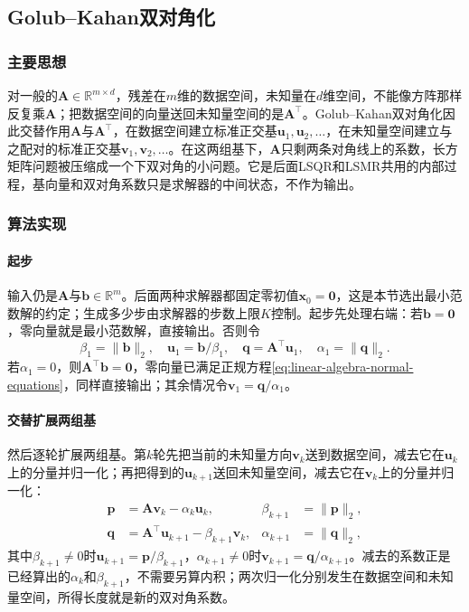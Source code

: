 \subsection{Golub--Kahan双对角化}
\label{sec:ls-bidiagonal-iteration}

\subsubsection{主要思想}

对一般的$\bm A\in\mathbb R^{m\times d}$，残差在$m$维的数据空间，未知量在$d$维空间，不能像方阵那样反复乘$\bm A$；把数据空间的向量送回未知量空间的是$\bm A^\top$。Golub--Kahan双对角化因此交替作用$\bm A$与$\bm A^\top$，在数据空间建立标准正交基$\bm u_1,\bm u_2,\ldots$，在未知量空间建立与之配对的标准正交基$\bm v_1,\bm v_2,\ldots$。在这两组基下，$\bm A$只剩两条对角线上的系数，长方矩阵问题被压缩成一个下双对角的小问题。它是后面LSQR和LSMR共用的内部过程，基向量和双对角系数只是求解器的中间状态，不作为输出。

\subsubsection{算法实现}

\paragraph{起步}
输入仍是$\bm A$与$\bm b\in\mathbb R^m$。后面两种求解器都固定零初值$\bm x_0=\bm0$，这是本节选出最小范数解的约定；生成多少步由求解器的步数上限$K$控制。起步先处理右端：若$\bm b=\bm0$，零向量就是最小范数解，直接输出。否则令
\[
 \beta_1=\lVert\bm b\rVert_2,\quad \bm u_1=\bm b/\beta_1,\quad
 \bm q=\bm A^\top\bm u_1,\quad \alpha_1=\lVert\bm q\rVert_2 .
\]
若$\alpha_1=0$，则$\bm A^\top\bm b=\bm0$，零向量已满足正规方程\eqref{eq:linear-algebra-normal-equations}，同样直接输出；其余情况令$\bm v_1=\bm q/\alpha_1$。

\paragraph{交替扩展两组基}
然后逐轮扩展两组基。第$k$轮先把当前的未知量方向$\bm v_k$送到数据空间，减去它在$\bm u_k$上的分量并归一化；再把得到的$\bm u_{k+1}$送回未知量空间，减去它在$\bm v_k$上的分量并归一化：
\[
 \begin{aligned}
 \bm p&=\bm A\bm v_k-\alpha_k\bm u_k, & \beta_{k+1}&=\lVert\bm p\rVert_2,\\
 \bm q&=\bm A^\top\bm u_{k+1}-\beta_{k+1}\bm v_k, & \alpha_{k+1}&=\lVert\bm q\rVert_2,
 \end{aligned}
\]
其中$\beta_{k+1}\ne0$时$\bm u_{k+1}=\bm p/\beta_{k+1}$，$\alpha_{k+1}\ne0$时$\bm v_{k+1}=\bm q/\alpha_{k+1}$。减去的系数正是已经算出的$\alpha_k$和$\beta_{k+1}$，不需要另算内积；两次归一化分别发生在数据空间和未知量空间，所得长度就是新的双对角系数。

